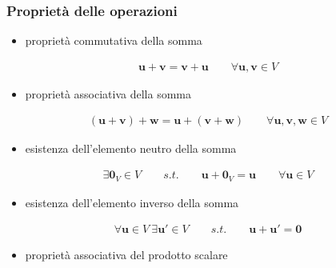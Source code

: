 \documentclass[letterpaper,10pt,italian]{jupyterBook}
\begin{document}
\subsubsection*{Proprietà delle operazioni}
\begin{itemize}
\item {} 
\sphinxAtStartPar
proprietà commutativa della somma

\end{itemize}
\begin{equation*}
\begin{split}\mathbf{u} + \mathbf{v} = \mathbf{v} + \mathbf{u} \qquad \forall \mathbf{u}, \mathbf{v} \in V\end{split}
\end{equation*}\begin{itemize}
\item {} 
\sphinxAtStartPar
proprietà associativa della somma

\end{itemize}
\begin{equation*}
\begin{split}(\mathbf{u} + \mathbf{v}) + \mathbf{w} = \mathbf{u} + ( \mathbf{v} + \mathbf{w} ) \qquad \forall \mathbf{u}, \mathbf{v}, \mathbf{w} \in V\end{split}
\end{equation*}\begin{itemize}
\item {} 
\sphinxAtStartPar
esistenza dell’elemento neutro della somma

\end{itemize}
\begin{equation*}
\begin{split}\exists \mathbf{0}_V \in V \qquad s.t. \qquad \mathbf{u} + \mathbf{0}_V = \mathbf{u} \qquad \forall \mathbf{u} \in V\end{split}
\end{equation*}\begin{itemize}
\item {} 
\sphinxAtStartPar
esistenza dell’elemento inverso della somma

\end{itemize}
\begin{equation*}
\begin{split}\forall \mathbf{u} \in V \ \exists \mathbf{u}' \in V \qquad s.t. \qquad \mathbf{u} + \mathbf{u}' = \mathbf{0}\end{split}
\end{equation*}\begin{itemize}
\item {} 
\sphinxAtStartPar
proprietà associativa del prodotto scalare

\end{itemize}
\end{document}
